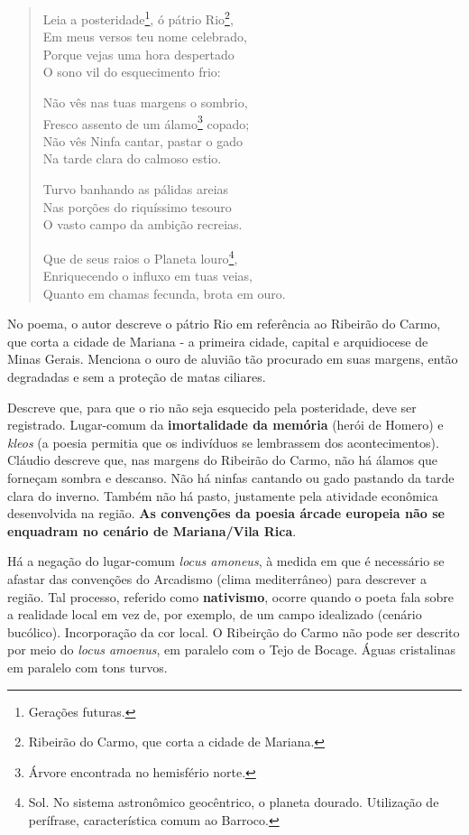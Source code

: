 \begin{verse}
Leia a posteridade\footnote{Gerações futuras.}, ó pátrio Rio\footnote{Ribeirão do Carmo, que corta a cidade de Mariana.}, \\
Em meus versos teu nome celebrado, \\
Porque vejas uma hora despertado \\
O sono vil do esquecimento frio:
				
Não vês nas tuas margens o sombrio, \\
Fresco assento de um álamo\footnote{Árvore encontrada no hemisfério norte.} copado; \\
Não vês Ninfa cantar, pastar o gado \\
Na tarde clara do calmoso estio.
				
Turvo banhando as pálidas areias \\
Nas porções do riquíssimo tesouro \\
O vasto campo da ambição recreias.
				
Que de seus raios o Planeta louro\footnote{Sol. No sistema astronômico geocêntrico, o planeta dourado. Utilização de perífrase, característica comum ao Barroco.}, \\
Enriquecendo o influxo em tuas veias, \\
Quanto em chamas fecunda, brota em ouro.
\end{verse}

No poema, o autor descreve o pátrio Rio em referência ao Ribeirão do Carmo, que corta a cidade de Mariana - a primeira cidade, capital e arquidiocese de Minas Gerais. Menciona o ouro de aluvião tão procurado em suas margens, então degradadas e sem a proteção de matas ciliares.

Descreve que, para que o rio não seja esquecido pela posteridade, deve ser registrado. Lugar-comum da \textbf{imortalidade da memória} (herói de Homero) e \textit{kleos} (a poesia permitia que os indivíduos se lembrassem dos acontecimentos).
Cláudio descreve que, nas margens do Ribeirão do Carmo, não há álamos que forneçam sombra e descanso. Não há ninfas cantando ou gado pastando da tarde clara do inverno. Também não há pasto, justamente pela atividade econômica desenvolvida na região. \textbf{As convenções da poesia árcade europeia não se enquadram no cenário de Mariana/Vila Rica}.

Há a negação do lugar-comum \textit{locus amoneus}, à medida em que é necessário se afastar das convenções do Arcadismo (clima mediterrâneo) para descrever a região. Tal processo, referido como \textbf{nativismo}, ocorre quando o poeta fala sobre a realidade local em vez de, por exemplo, de um campo idealizado (cenário bucólico). Incorporação da cor local. O Ribeirção do Carmo não pode ser descrito por meio do \textit{locus amoenus}, em paralelo com o Tejo de Bocage. Águas cristalinas em paralelo com tons turvos.

